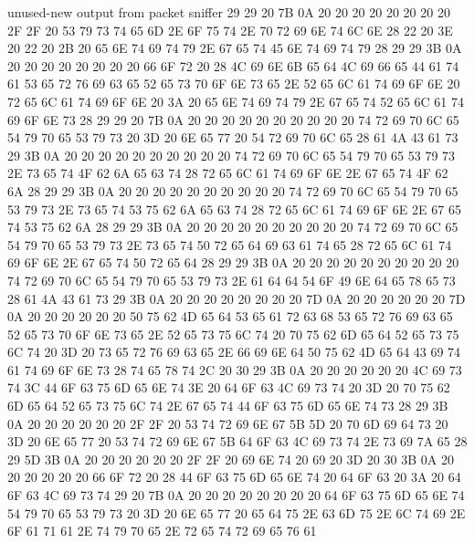 \begin{chunk}{unused-new output from packet sniffer}
29 29 20 7B 0A 20 20 20 20 20 20 20 20 2F 2F 20 53 79 73 74 65 6D 2E 6F 75 
74 2E 70 72 69 6E 74 6C 6E 28 22 20 3E 20 22 20 2B 20 65 6E 74 69 74 79 2E 
67 65 74 45 6E 74 69 74 79 28 29 29 3B 0A 20 20 20 20 20 20 20 20 66 6F 72 
20 28 4C 69 6E 6B 65 64 4C 69 66 65 44 61 74 61 53 65 72 76 69 63 65 52 65 
73 70 6F 6E 73 65 2E 52 65 6C 61 74 69 6F 6E 20 72 65 6C 61 74 69 6F 6E 20 
3A 20 65 6E 74 69 74 79 2E 67 65 74 52 65 6C 61 74 69 6F 6E 73 28 29 29 20 
7B 0A 20 20 20 20 20 20 20 20 20 20 74 72 69 70 6C 65 54 79 70 65 53 79 73 
20 3D 20 6E 65 77 20 54 72 69 70 6C 65 28 61 4A 43 61 73 29 3B 0A 20 20 20 
20 20 20 20 20 20 20 74 72 69 70 6C 65 54 79 70 65 53 79 73 2E 73 65 74 4F 
62 6A 65 63 74 28 72 65 6C 61 74 69 6F 6E 2E 67 65 74 4F 62 6A 28 29 29 3B 
0A 20 20 20 20 20 20 20 20 20 20 74 72 69 70 6C 65 54 79 70 65 53 79 73 2E 
73 65 74 53 75 62 6A 65 63 74 28 72 65 6C 61 74 69 6F 6E 2E 67 65 74 53 75 
62 6A 28 29 29 3B 0A 20 20 20 20 20 20 20 20 20 20 74 72 69 70 6C 65 54 79 
70 65 53 79 73 2E 73 65 74 50 72 65 64 69 63 61 74 65 28 72 65 6C 61 74 69 
6F 6E 2E 67 65 74 50 72 65 64 28 29 29 3B 0A 20 20 20 20 20 20 20 20 20 20 
74 72 69 70 6C 65 54 79 70 65 53 79 73 2E 61 64 64 54 6F 49 6E 64 65 78 65 
73 28 61 4A 43 61 73 29 3B 0A 20 20 20 20 20 20 20 20 7D 0A 20 20 20 20 20 
20 7D 0A 20 20 20 20 20 20 50 75 62 4D 65 64 53 65 61 72 63 68 53 65 72 76 
69 63 65 52 65 73 70 6F 6E 73 65 2E 52 65 73 75 6C 74 20 70 75 62 6D 65 64 
52 65 73 75 6C 74 20 3D 20 73 65 72 76 69 63 65 2E 66 69 6E 64 50 75 62 4D 
65 64 43 69 74 61 74 69 6F 6E 73 28 74 65 78 74 2C 20 30 29 3B 0A 20 20 20 
20 20 20 4C 69 73 74 3C 44 6F 63 75 6D 65 6E 74 3E 20 64 6F 63 4C 69 73 74 
20 3D 20 70 75 62 6D 65 64 52 65 73 75 6C 74 2E 67 65 74 44 6F 63 75 6D 65 
6E 74 73 28 29 3B 0A 20 20 20 20 20 20 2F 2F 20 53 74 72 69 6E 67 5B 5D 20 
70 6D 69 64 73 20 3D 20 6E 65 77 20 53 74 72 69 6E 67 5B 64 6F 63 4C 69 73 
74 2E 73 69 7A 65 28 29 5D 3B 0A 20 20 20 20 20 20 2F 2F 20 69 6E 74 20 69 
20 3D 20 30 3B 0A 20 20 20 20 20 20 66 6F 72 20 28 44 6F 63 75 6D 65 6E 74 
20 64 6F 63 20 3A 20 64 6F 63 4C 69 73 74 29 20 7B 0A 20 20 20 20 20 20 20 
20 64 6F 63 75 6D 65 6E 74 54 79 70 65 53 79 73 20 3D 20 6E 65 77 20 65 64 
75 2E 63 6D 75 2E 6C 74 69 2E 6F 61 71 61 2E 74 79 70 65 2E 72 65 74 72 69 
65 76 61 
\end{chunk}



